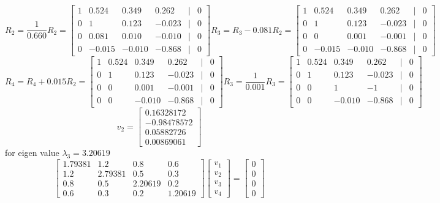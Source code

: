 \documentclass[a3paper,12pt]{extarticle} %
\begin{document}
\begin{enumerate}
\begin{enumerate}
        \[
        R_2 = \frac{1}{0.660}R_2 = \begin{bmatrix}1 & 0.524 & 0.349 & 0.262 & | & 0\\0 & 1 & 0.123 & -0.023 & | & 0\\0 & 0.081 & 0.010 & -0.010 & | & 0\\0 & -0.015 & -0.010 & -0.868 & | & 0\end{bmatrix}
        R_3 = R_3 - 0.081R_2 = \begin{bmatrix}1 & 0.524 & 0.349 & 0.262 & | & 0\\0 & 1 & 0.123 & -0.023 & | & 0\\0 & 0 & 0.001 & -0.001 & | & 0\\0 & -0.015 & -0.010 & -0.868 & | & 0\end{bmatrix}
        \]
        \[
        R_4 = R_4 + 0.015R_2 = \begin{bmatrix}1 & 0.524 & 0.349 & 0.262 & | & 0\\0 & 1 & 0.123 & -0.023 & | & 0\\0 & 0 & 0.001 & -0.001 & | & 0\\0 & 0 & -0.010 & -0.868 & | & 0\end{bmatrix}
        R_3 = \frac{1}{0.001}R_3 = \begin{bmatrix}1 & 0.524 & 0.349 & 0.262 & | & 0\\0 & 1 & 0.123 & -0.023 & | & 0\\0 & 0 & 1 & -1 & | & 0\\0 & 0 & -0.010 & -0.868 & | & 0\end{bmatrix}
        \]
        \[
        v_2 = \begin{bmatrix}0.16328172\\-0.98478572\\0.05882726\\0.00869061\end{bmatrix}
        \]
        for eigen value \(\lambda_3 = 3.20619\)
        \[
        \begin{bmatrix}1.79381 & 1.2 & 0.8 & 0.6\\1.2 & 2.79381 & 0.5 & 0.3\\0.8 & 0.5 & 2.20619 & 0.2\\0.6 & 0.3 & 0.2 & 1.20619\end{bmatrix} \begin{bmatrix}v_1\\v_2\\v_3\\v_4\end{bmatrix} = \begin{bmatrix}0\\0\\0\\0\end{bmatrix}
\]
\end{enumerate}
\end{enumerate}
\end{document}
